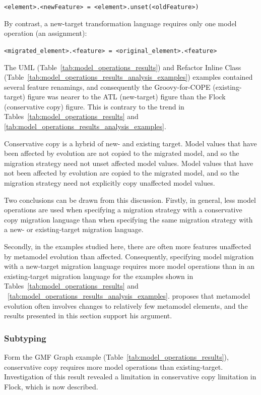 \texttt{<element>.<newFeature> = <element>.unset(<oldFeature>)}

By contrast, a new-target transformation language requires only one model operation (an assignment):

\texttt{<migrated\_element>.<feature> = <original\_element>.<feature>}

The UML (Table~\ref{tab:model_operations_results}) and Refactor Inline Class (Table~\ref{tab:model_operations_results_analysis_examples}) examples contained several feature renamings, and consequently the Groovy-for-COPE (existing-target) figure was nearer to the ATL (new-target) figure than the Flock (conservative copy) figure. This is contrary to the trend in Tables~\ref{tab:model_operations_results} and \ref{tab:model_operations_results_analysis_examples}.

Conservative copy is a hybrid of new- and existing target. Model values that have been affected by evolution are not copied to the migrated model, and so the migration strategy need not unset affected model values. Model values that have not been affected by evolution are copied to the migrated model, and so the migration strategy need not explicitly copy unaffected model values.

Two conclusions can be drawn from this discussion. Firstly, in general, less model operations are used when specifying a migration strategy with a conservative copy migration language than when specifying the same migration strategy with a new- or existing-target migration language.

Secondly, in the examples studied here, there are often more features unaffected by metamodel evolution than affected. Consequently, specifying model migration with a new-target migration language requires more model operations than in an existing-target migration language for the examples shown in Tables~\ref{tab:model_operations_results} and ~\ref{tab:model_operations_results_analysis_examples}. \cite{sprinkle03thesis} proposes that metamodel evolution often involves changes to relatively few metamodel elements, and the results presented in this section support his argument.  

\subsubsection{Subtyping}
Form the GMF Graph example (Table~\ref{tab:model_operations_results}), conservative copy requires more model operations than existing-target. Investigation of this result revealed a limitation in conservative copy limitation in Flock, which is now described.

